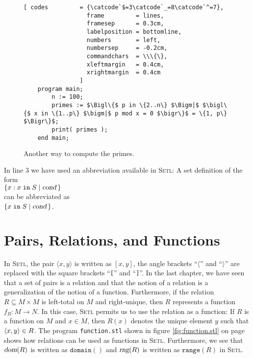 \begin{figure}[!ht]
  \centering
\begin{Verbatim}[ codes         = {\catcode`$=3\catcode`_=8\catcode`^=7},
                  frame         = lines, 
                  framesep      = 0.3cm, 
                  labelposition = bottomline,
                  numbers       = left,
                  numbersep     = -0.2cm,
                  commandchars  = \\\{\},
                  xleftmargin   = 0.4cm,
                  xrightmargin  = 0.4cm
                ]
    program main;
        n := 100;
        primes := $\Bigl\{$ p in \{2..n\} $\Bigm|$ $\bigl\{$ x in \{1..p\} $\bigm|$ p mod x = 0 $\bigr\}$ = \{1, p\} $\Bigr\}$;
        print( primes );
    end main;
\end{Verbatim} 
\vspace*{-0.3cm}
\caption{Another way to compute the primes. \label{fig:primes-slim.stl}}
\end{figure} %

In line 3 we have used an abbreviation available in \textsc{Setl}:  A set definition of the form
\\[0.2cm]
\hspace*{1.3cm} 
$\{ x \;\mathtt{:}\; x \;\mathtt{in}\; S \mid \textsl{cond} \,\}$ 
\\[0.2cm]
can be abbreviated as \\[0.2cm]
\hspace*{1.3cm} 
$\{ x \;\mathtt{in}\; S \mid \textsl{cond} \,\}$. 


\section{Pairs, Relations,  and Functions}
In \textsc{Setl}, the pair $\langle x, y \rangle$ is written as $[x,y]$,
the angle brackets ``$\langle$'' and ``$\rangle$'' are replaced with the square brackets
``\texttt{[}'' and ``\texttt{]}''.
In the last chapter, we have seen that a set of pairs is a relation and that the notion of
a relation is a generalization of the notion of a function.
Furthermore, if the relation $R \subseteq M \times M$ is left-total on $M$ and
right-unique,  then $R$ represents a function $f_R:M \rightarrow N$.  In this case,
\textsc{Setl} permits us to use the relation as a function:  If $R$ is a function on $M$
and $x \in M$, then $R(x)$ denotes the unique element $y$ such that $\pair(x,y) \in R$.
The program \texttt{function.stl} shown in figure
\ref{fig:function.stl} on page \pageref{fig:function.stl} shows how relations can be used
as functions in  \textsc{Setl}.  Furthermore, we see that $\textsl{dom}(R)$ is written as
$\mathtt{domain}()$ and $\textsl{rng}(R)$ is written as $\mathtt{range}(R)$ in \textsc{Setl}.
 

